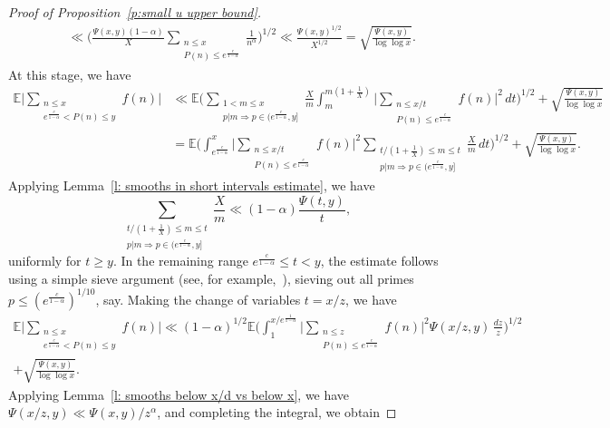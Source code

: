 \documentclass[12pt,a4paper,reqno]{amsart}
\numberwithin{equation}{section}
\def\E{\mathbb E}
\def\leq {\leqslant}
\theoremstyle{remark}
\theoremstyle{definition}
\numberwithin{equation}{section}
\theoremstyle{remark}
\def\E{\mathbb E}
\begin{document}
\begin{proof}[Proof of Proposition~\ref{p:small u upper bound}]
\begin{align*}
& \ll \biggl( \frac{\Psi (x, y) (1-\alpha)}{X} \sum_{\substack{n \leq x \\ P(n) \leq e^{\frac{c}{1 - \alpha}}}} \frac{1}{n^{\alpha}} \biggr)^{1/2} \ll \frac{\Psi(x,y)^{1/2}}{X^{1/2}} = \sqrt{\frac{\Psi(x,y)}{\log \log x}} .
\end{align*}
At this stage, we have
\begin{align*}
\E \biggl| \sum_{\substack{n \leq x \\ e^{\frac{c}{1-\alpha}} < P(n) \leq y}} f(n) \biggr| &\ll \E \biggl( \sum_{\substack{1 < m \leq x \\ p | m \Rightarrow p \in (e^{\frac{c}{1-\alpha}}, y]}} \frac{X}{m} \int_{m}^{m(1+\frac{1}{X})} \biggl| \sum_{\substack{n \leq x/t \\ P(n) \leq e^{\frac{c}{1 - \alpha}}}} f(n) \biggr|^2 \, dt \biggr)^{1/2} + \sqrt{\frac{\Psi(x,y)}{\log \log x}} \\
& = \E \biggl( \int_{e^{\frac{c}{1-\alpha}}}^{x} \biggl| \sum_{\substack{n \leq x/t \\ P(n) \leq e^{\frac{c}{1 - \alpha}}}} f(n) \biggr|^2 \sum_{\substack{t/(1 + \frac{1}{X})\leq m \leq t \\ p | m \Rightarrow p \in (e^{\frac{c}{1-\alpha}}, y]}} \frac{X}{m}  \, dt \biggr)^{1/2} + \sqrt{\frac{\Psi(x,y)}{\log \log x}}  .
\end{align*}
Applying Lemma~\ref{l: smooths in short intervals estimate}, we have
\[
\sum_{\substack{t/(1 + \frac{1}{X})\leq m \leq t \\ p | m \Rightarrow p \in (e^{\frac{c}{1-\alpha}}, y]}} \frac{X}{m} \ll ( 1- \alpha ) \frac{\Psi (t,y)}{t} ,
\]
uniformly for $t \geq y$. In the remaining range $e^{\frac{c}{1 - \alpha}} \leq t < y$, the estimate follows using a simple sieve argument (see, for example,~\cite[Theorem~3.6]{MV2007}), sieving out all primes $p \leq (e^{\frac{c}{1 - \alpha}})^{1/10}$, say. Making the change of variables $t = x/z$, we have
\begin{multline*}
\E \biggl| \sum_{\substack{n \leq x \\ e^{\frac{c}{1-\alpha}} < P(n) \leq y}} f(n) \biggr| \ll
(1 - \alpha)^{1/2} \E \biggl( \int_{1}^{x/e^{\frac{1}{1 - \alpha}}} \biggl| \sum_{\substack{n \leq z \\ P(n) \leq e^{\frac{c}{1 - \alpha}}}} f(n) \biggr|^2  \Psi (x/z, y) \, \frac{dz}{z} \biggr)^{1/2} \\ + \sqrt{\frac{\Psi(x,y)}{\log \log x}} .
\end{multline*}
Applying Lemma~\ref{l: smooths below x/d vs below x}, we have $\Psi(x/z, y) \ll \Psi(x, y)/z^{\alpha}$, and completing the integral, we obtain

\end{proof}
\end{document}
